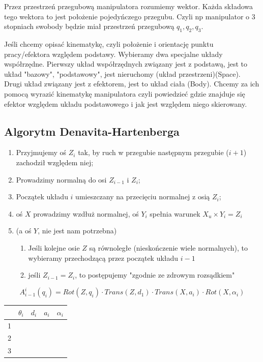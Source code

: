 \documentclass{article}
\begin{document}
Przez przestrzeń przegubową manipulatora rozumiemy wektor. Każda składowa tego wektora to jest położenie pojedyńczego przegubu. Czyli np manipulator o 3 stopniach swobody będzie miał przestrzeń przegubową $q_{1}, q_{2}, q_{3}$.

Jeśli chcemy opisać kinematykę, czyli położenie i orientację punktu pracy/efektora względem podstawy. Wybieramy dwa specjalne układy współrzędne.
Pierwszy układ współrzędnych związany jest z podstawą, jest to układ "bazowy", "podstawowy", jest nieruchomy (układ przestrzeni)(Space).
Drugi układ związany jest z efektorem, jest to układ ciała (Body).
Chcemy za ich pomocą wyrazić kinematykę manipulatora czyli powiedzieć gdzie znajduje się efektor względem układu podstawowego i jak jest względem niego skierowany.

\newpage

\subsection{Algorytm Denavita-Hartenberga}

\begin{enumerate}
    \item Przyjmujemy oś $Z_i$ tak, by ruch w przegubie następnym przegubie ($i+1$) zachodził względem niej;
    \item Prowadzimy normalną do osi $Z_{i-1}$ i $Z_i$;
    \item Początek układu $i$ umieszczany na przecięciu normalnej z osią $Z_i$;
    \item oś $X$ prowadzimy wzdłuż normalnej, oś $Y_i$ spełnia warunek $X_u \times Y_i = Z_i$
    \item (a oś $Y$, nie jest nam potrzebna)
          \begin{enumerate}
              \item Jeśli kolejne osie $Z$ są równoległe (nieskończenie wiele normalnych),
                    to wybieramy przechodzącą przez początek układu $i-1$
              \item jeśli $Z_{i-1} = Z_i$, to postępujemy "zgodnie ze zdrowym rozsądkiem"
          \end{enumerate}
\end{enumerate}

\Large
$$
    A_{i-1}^i (q_i) = Rot(Z,q_i) \cdot Trans(Z,d_1) \cdot Trans( X, a_i ) \cdot Rot( X, \alpha_i )
$$
\normalsize

\begin{table}[h!]
    \centering
    \Large
    \begin{tabular}{c|c|c|c|c}
          & $\theta_i$ & $d_i$ & $a_i$ & $\alpha_i$ \\ \hline
        1 &            &       &       &            \\ \hline
        2 &            &       &       &            \\ \hline
        3 &            &       &       &            \\
    \end{tabular}
\end{table}
\end{document}

